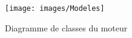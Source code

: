 \begin{figure}[htbp]
  \centering
  \texttt{[image: images/Modeles]}
  \caption{Diagramme de classes du moteur}
  \label{fig:diagrammedeclasse}
\end{figure}
